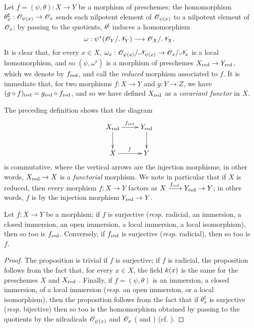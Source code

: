 \begin{env}[5.1.5]
\label{1.5.1.5}
Let $f=(\psi,\theta):X\to Y$ be a morphism of preschemes;
the homomorphism $\theta_x^\sharp:\OO_{\psi(x)}\to\OO_x$ sends each nilpotent element of $\mathscr{O}_{\psi(x)}$ to a nilpotent element of $\mathscr{O}_x$;
by passing to the quotients, $\theta^\sharp$ induces a homomorphism
\[
  \omega:\psi^*(\OO_Y/\sh{N}_Y)\to\OO_X/\sh{N}_X.
\]
It is clear that, for every $x\in X$, $\omega_x:\OO_{\psi(x)}/\sh{N}_{\psi(x)}\to\OO_x/\sh{N}_x$ is a local homomorphism, and so $(\psi,\omega^\flat)$ is a morphism of preschemes $X_\red\to Y_\red$, which we denote by $f_{\mathrm{red}}$, and call the \emph{reduced} morphism associated to $f$.
It is immediate that, for two morphisms $f:X\to Y$ and $g:Y\to Z$, we have $(g\circ f)_{\mathrm{red}}=g_{\mathrm{red}}\circ f_{\mathrm{red}}$, and so we have defined $X_{\mathrm{red}}$ as a \emph{covariant functor} in $X$.

The preceding definition shows that the diagram
\[
  \xymatrix{
    X_\red\ar[r]^{f_\red}\ar[d] &
    Y_\red\ar[d]\\
    X\ar[r]^f &
    Y
  }
\]
is commutative, where the vertical arrows are the injection morphisms;
in other words, $X_\red\to X$ is a \emph{functorial} morphism.
We note in particular that if $X$ is reduced, then every morphism $f:X\to Y$ factors as $X\xrightarrow{f_\red}Y_\red\to Y$;
in other words, $f$ is  by the injection morphism $Y_\red\to Y$.
\end{env}

\begin{prop}[5.1.6]
\label{1.5.1.6}
Let $f:X\to Y$ be a morphism;
if $f$ is surjective (\emph{resp.} radicial, an immersion, a closed immersion, an open immersion, a local immersion, a local isomorphism), then so too is $f_{\mathrm{red}}$.
Conversely, if $f_{\mathrm{red}}$ is surjective (\emph{resp.} radicial), then so too is $f$.
\end{prop}

\begin{proof}
\label{proof-1.5.1.6}
The proposition is trivial if $f$ is surjective;
if $f$ is radicial, the proposition follows from the fact that, for every $x\in X$, the field $k(x)$ is the same for the preschemes $X$ and $X_{\mathrm{red}}$ .
Finally, if $f=(\psi,\theta)$ is an immersion, a closed immersion, of a local immersion (\emph{resp.} an open immersion, or a local isomorphism), then the proposition follows from the fact that if $\theta_x^\sharp$ is surjective (\emph{resp.} bijective) then so too is the homomorphism obtained by passing to the quotients by the nilradicals $\mathscr{O}_{\psi(x)}$ and $\mathscr{O}_x$ ( and ) (cf. ).
\end{proof}

